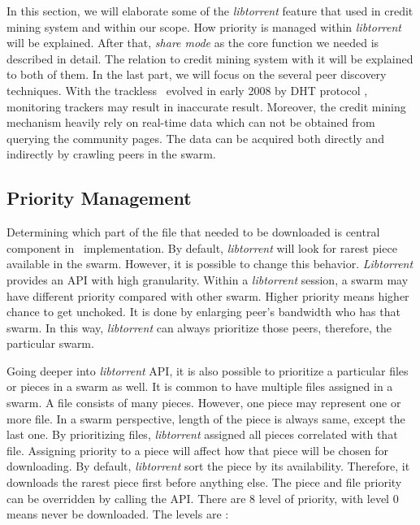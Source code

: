 In this section, we will elaborate some of the \textit{libtorrent} feature that used in credit mining system and within our scope. How priority is managed within \textit{libtorrent} will be explained. After that, \textit{share mode} as the core function we needed is described in detail. The relation to credit mining system with it will be explained to both of them. In the last part, we will focus on the several peer discovery techniques. With the trackless \bt~evolved in early 2008 by DHT protocol \cite{2008:dht:loewenstern}, monitoring trackers may result in inaccurate result. Moreover, the credit mining mechanism heavily rely on real-time data which can not be obtained from querying the community pages. The data can be acquired both directly and indirectly by crawling peers in the swarm.

\subsection{Priority Management}
Determining which part of the file that needed to be downloaded is central component in \bt~implementation. By default, \textit{libtorrent} will look for rarest piece available in the swarm. However, it is possible to change this behavior. \textit{Libtorrent} provides an API with high granularity. Within a \textit{libtorrent} session, a swarm may have different priority compared with other swarm. Higher priority means higher chance to get unchoked. It is done by enlarging peer's bandwidth who has that swarm. In this way, \textit{libtorrent} can always prioritize those peers, therefore, the particular swarm. 

Going deeper into \textit{libtorrent} API, it is also possible to prioritize a particular files or pieces in a swarm as well. It is common to have multiple files assigned in a swarm. A file consists of many pieces. However, one piece may represent one or more file. In a swarm perspective, length of the piece is always same, except the last one. By prioritizing files, \textit{libtorrent} assigned all pieces correlated with that file. Assigning priority to a piece will affect how that piece will be chosen for downloading. By default, \textit{libtorrent} sort the piece by its availability. Therefore, it downloads the rarest piece first before anything else. The piece and file priority can be overridden by calling the API. There are 8 level of priority, with level 0 means never be downloaded. The levels are : 

